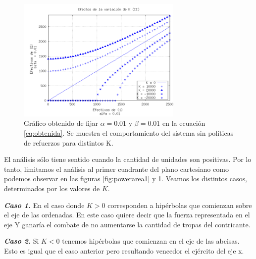 \documentclass{sig-alternate}
\begin{document}
\begin{figure}[h]
\begin{center}
\includegraphics[width=8cm]{power_areas_2}
\caption{\label{fig:powerarea2} Gr\'afico obtenido de fijar $\alpha = 0.01$ y $\beta = 0.01$ en la ecuación \ref{eq:obtenida}. Se muestra el comportamiento del sistema sin políticas de refuerzos para distintos K.}
\end{center}
\end{figure}

El an\'alisis s\'olo tiene sentido cuando la cantidad de unidades son positivas.
Por lo tanto, limitamos el an\'alisis al primer cuadrante del plano cartesiano como podemos observar en 
las figuras \ref{fig:powerarea1} y \ref{fig:powerarea2}.
Veamos los distintos casos, determinados por los valores de $K$.

\textbf{\textit{Caso 1.}} En el caso donde $K > 0$ corresponden a hip\'erbolas que comienzan
sobre el eje de las ordenadas. En este caso quiere decir que la fuerza representada
en el eje Y ganar\'ia el combate de no aumentarse la cantidad de tropas del contricante.


\textbf{\textit{Caso 2.}} Si $K<0$ tenemos hip\'erbolas que comienzan
en el eje de las abcisas. Esto es igual que el caso anterior pero resultando vencedor el ejército del eje x.
\end{document}
